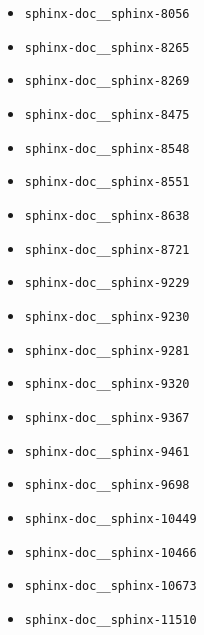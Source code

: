 \begin{multicols}{2}
\begin{itemize}
  \item \texttt{sphinx-doc\_\_sphinx-8056}
  \item \texttt{sphinx-doc\_\_sphinx-8265}
  \item \texttt{sphinx-doc\_\_sphinx-8269}
  \item \texttt{sphinx-doc\_\_sphinx-8475}
  \item \texttt{sphinx-doc\_\_sphinx-8548}
  \item \texttt{sphinx-doc\_\_sphinx-8551}
  \item \texttt{sphinx-doc\_\_sphinx-8638}
  \item \texttt{sphinx-doc\_\_sphinx-8721}
  \item \texttt{sphinx-doc\_\_sphinx-9229}
  \item \texttt{sphinx-doc\_\_sphinx-9230}
  \item \texttt{sphinx-doc\_\_sphinx-9281}
  \item \texttt{sphinx-doc\_\_sphinx-9320}
  \item \texttt{sphinx-doc\_\_sphinx-9367}
  \item \texttt{sphinx-doc\_\_sphinx-9461}
  \item \texttt{sphinx-doc\_\_sphinx-9698}
  \item \texttt{sphinx-doc\_\_sphinx-10449}
  \item \texttt{sphinx-doc\_\_sphinx-10466}
  \item \texttt{sphinx-doc\_\_sphinx-10673}
  \item \texttt{sphinx-doc\_\_sphinx-11510}
\end{itemize}
\end{multicols}
